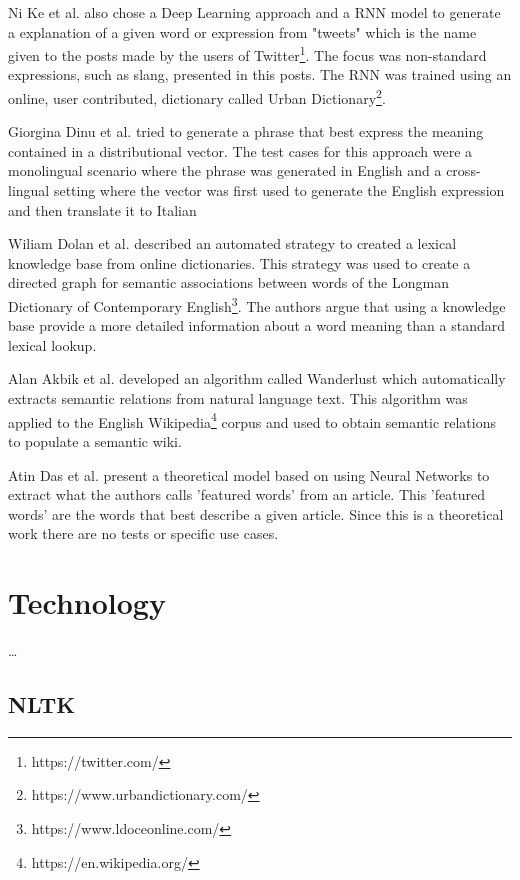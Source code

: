 Ni Ke et al.\cite{ni2017learning} also chose a Deep Learning approach and a \gls{RNN} model to generate a explanation of a given word or expression from "tweets" which is the name given to the posts made by the users of Twitter\footnote{https://twitter.com/}.
The focus was non-standard expressions, such as slang, presented in this posts.
The \gls{RNN} was trained using an online, user contributed, dictionary called Urban Dictionary\footnote{https://www.urbandictionary.com/}.

Giorgina Dinu et al.\cite{dinu2014make} tried to generate a phrase that best express the meaning contained in a distributional vector.
The test cases for this approach were a monolingual scenario where the phrase was generated in English and a cross-lingual setting where the vector was first used to generate the English expression and then translate it to Italian

Wiliam Dolan et al.\cite{dolan1993automatically} described an automated strategy to created a lexical knowledge base from online dictionaries.
This strategy was used to create a directed graph for semantic associations between words of the Longman Dictionary of Contemporary English\footnote{https://www.ldoceonline.com/}.
The authors argue that using a knowledge base provide a more detailed information about a word meaning than a standard lexical lookup.

Alan Akbik et al.\cite{akbik2009wanderlust} developed an algorithm called Wanderlust which automatically extracts semantic relations from natural language text.
This algorithm was applied to the English Wikipedia\footnote{https://en.wikipedia.org/} corpus and used to obtain semantic relations to populate a semantic wiki.

Atin Das et al.\cite{das2008neural} present a theoretical model based on using Neural Networks to extract what the authors calls 'featured words' from an article.
This 'featured words' are the words that best describe a given article.
Since this is a theoretical work there are no tests or specific use cases.

\section{Technology}

\dots

\subsection{NLTK}

